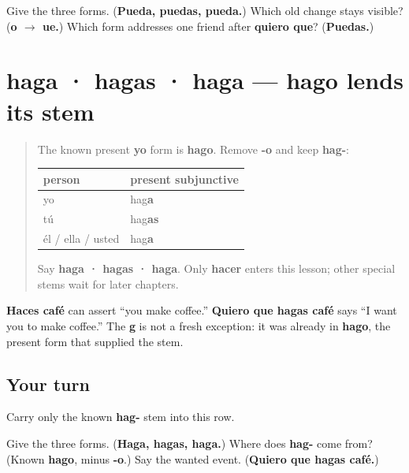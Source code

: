\begin{tcolorbox}[breakable,colback=teal!4,colframe=teal!35!black,title={Before you move on}]
Give the three forms. (\textbf{Pueda, puedas, pueda.}) Which old change stays visible? (\textbf{o $\to$ ue.}) Which form addresses one friend after \textbf{quiero que}? (\textbf{Puedas.})
\end{tcolorbox}
\section[haga · hagas · haga]{haga · hagas · haga — hago lends its stem}

\label{lesson:ES-C18-hacer-subjuntivo}



\begin{quote}
The known present \textbf{yo} form is \textbf{hago}. Remove \textbf{-o} and keep \textbf{hag-}:

\noindent
\begin{tabularx}{\linewidth}{@{}>{\raggedright\arraybackslash}X>{\raggedright\arraybackslash}X@{}}
\toprule
\textbf{person} & \textbf{present subjunctive} \\
\midrule
yo & hag\textbf{a} \\
tú & hag\textbf{as} \\
él / ella / usted & hag\textbf{a} \\
\bottomrule
\end{tabularx}

Say \textbf{haga · hagas · haga}. Only \textbf{hacer} enters this lesson; other special stems wait for later chapters.
\end{quote}

\begin{grammarlens}[title={Grammar Lens: spend the new form}]
\textbf{Haces café} can assert “you make coffee.” \textbf{Quiero que hagas café} says “I want you to make coffee.” The \textbf{g} is not a fresh exception: it was already in \textbf{hago}, the present form that supplied the stem.
\end{grammarlens}

\subsection*{Your turn}
Carry only the known \textbf{hag-} stem into this row.

\begin{tcolorbox}[breakable,colback=teal!4,colframe=teal!35!black,title={Before you move on}]
Give the three forms. (\textbf{Haga, hagas, haga.}) Where does \textbf{hag-} come from? (Known \textbf{hago}, minus \textbf{-o}.) Say the wanted event. (\textbf{Quiero que hagas café.})
\end{tcolorbox}
